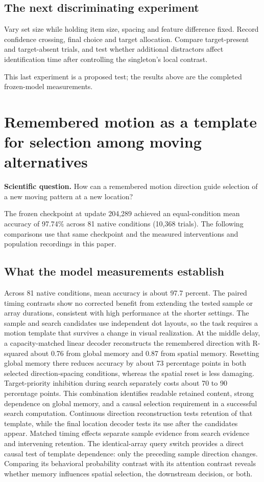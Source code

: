 \documentclass[11pt]{article}
\begin{document}
\subsection{The next discriminating experiment}
Vary set size while holding item size, spacing and feature difference fixed. Record confidence crossing, final choice and target allocation. Compare target-present and target-absent trials, and test whether additional distractors affect identification time after controlling the singleton’s local contrast.

This last experiment is a proposed test; the results above are the completed frozen-model measurements.
\clearpage\section{Remembered motion as a template for selection among moving alternatives}
\textbf{Scientific question.} How can a remembered motion direction guide selection of a new moving pattern at a new location?

The frozen checkpoint at update 204,289 achieved an equal-condition mean accuracy of 97.74\% across 81 native conditions (10,368 trials). The following comparisons use that same checkpoint and the measured interventions and population recordings in this paper.

\subsection{What the model measurements establish}
Across 81 native conditions, mean accuracy is about 97.7 percent. The paired timing contrasts show no corrected benefit from extending the tested sample or array durations, consistent with high performance at the shorter settings. The sample and search candidates use independent dot layouts, so the task requires a motion template that survives a change in visual realization. At the middle delay, a capacity-matched linear decoder reconstructs the remembered direction with R-squared about 0.76 from global memory and 0.87 from spatial memory. Resetting global memory there reduces accuracy by about 73 percentage points in both selected direction-spacing conditions, whereas the spatial reset is less damaging. Target-priority inhibition during search separately costs about 70 to 90 percentage points. This combination identifies readable retained content, strong dependence on global memory, and a causal selection requirement in a successful search computation. Continuous direction reconstruction tests retention of that template, while the final location decoder tests its use after the candidates appear. Matched timing effects separate sample evidence from search evidence and intervening retention. The identical-array query switch provides a direct causal test of template dependence: only the preceding sample direction changes. Comparing its behavioral probability contrast with its attention contrast reveals whether memory influences spatial selection, the downstream decision, or both.
\end{document}
